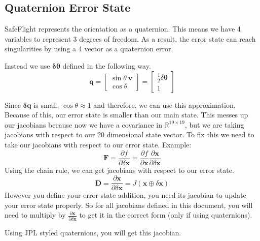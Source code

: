 \documentclass[11pt]{article}
\newcommand{\R}{\mathbb{R}}
\renewcommand{\vec}[1]{\mathbf{#1}}
\newcommand{\mat}[1]{\mathbf{#1}}
\begin{document}
\subsection{Quaternion Error State}
SafeFlight represents the orientation as a quaternion. This means we have 4 variables to represent 3 degrees of freedom. As a result, the error state can reach singularities by using a 4 vector as a quaternion error.

Instead we use $\vec{\delta \theta}$ defined in the following way.
$$\vec{q} = \begin{bmatrix}
\sin \theta~ \vec{v}\\
\cos \theta
\end{bmatrix} = \begin{bmatrix}
\frac{1}{2}\delta \vec{\theta}\\
1
\end{bmatrix}$$

Since $\vec{\delta q}$ is small, $\cos\theta \approx 1$ and therefore, we can use this approximation. Because of this, our error state is smaller than our main state. This messes up our jacobians because now we have a covariance in $\R^{19\times 19}$, but we are taking jacobians with respect to our 20 dimensional state vector. To fix this we need to take our jacobians with respect to our error state. Example:
$$\mat{F} = \frac{\partial f}{\partial \delta \vec{x}} = \frac{\partial f}{\partial \vec{x}}\frac{\partial \vec{x}}{\partial \delta \vec{x}}$$
Using the chain rule, we can get jacobians with respect to our error state.
$$\mat{D} = \frac{\partial \vec{x}}{\partial \delta \vec{x}} = J(\vec{x} \oplus \delta \vec{x})$$
However you define your error state addition, you need its jacobian to update your error state properly. So for all jacobians defined in this document, you will need to multiply by $\frac{\partial \vec{x}}{\partial \delta \vec{x}}$ to get it in the correct form (only if using quaternions).

Using JPL styled quaternions, you will get this jacobian. 
\end{document}

